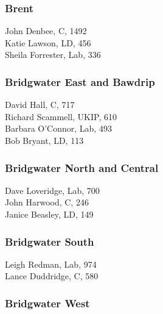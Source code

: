 \documentclass[a4paper,openany,10pt]{book}
\begin{document}
\subsubsection*{Brent}



John Denbee, C, 1492\\
Katie Lawson, LD, 456\\
Sheila Forrester, Lab, 336\\


\subsubsection*{Bridgwater East and Bawdrip}



David Hall, C, 717\\
Richard Scammell, UKIP, 610\\
Barbara O'Connor, Lab, 493\\
Bob Bryant, LD, 113\\


\subsubsection*{Bridgwater North and Central}



Dave Loveridge, Lab, 700\\
John Harwood, C, 246\\
Janice Beasley, LD, 149\\


\subsubsection*{Bridgwater South}



Leigh Redman, Lab, 974\\
Lance Duddridge, C, 580\\


\subsubsection*{Bridgwater West}
\end{document}
